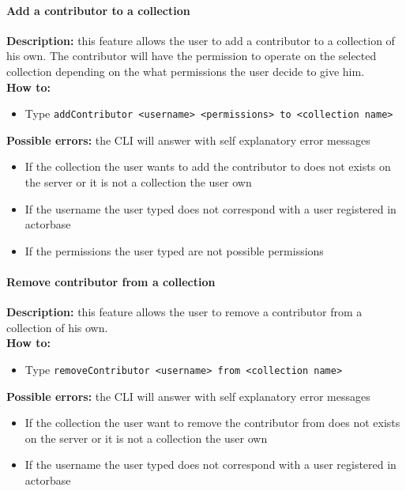 \documentclass{scalatekids-article}
\begin{document}
\paragraph{Add a contributor to a collection}
\label{sec:addcontributor}
\textbf{Description:} this feature allows the user to add a contributor 
to a collection of his own. The contributor will have the permission to operate on the selected collection depending on the what permissions the user decide to give him.\\
\textbf{How to:} 
\begin{itemize}
	\item Type \texttt{addContributor <username> <permissions> to <collection name>}
\end{itemize}
\textbf{Possible errors:} the CLI will answer with self explanatory error messages 
\begin{itemize}
	\item If the collection the user wants to add the contributor to does not exists on the server or it is not a collection the user own
	\item If the username the user typed does not correspond with a user registered in actorbase
	\item If the permissions the user typed are not possible permissions
\end{itemize}

\paragraph{Remove contributor from a collection}
\label{sec:removecontributor}
\textbf{Description:} this feature allows the user to remove a contributor from a collection of his own.\\
\textbf{How to:} 
\begin{itemize}
	\item Type \texttt{removeContributor <username> from <collection name>}
\end{itemize}
\textbf{Possible errors:} the CLI will answer with self explanatory error messages 
\begin{itemize}
	\item If the collection the user want to remove the contributor from does not exists on the server or it is not a collection the user own
	\item If the username the user typed does not correspond with a user registered in actorbase
\end{itemize}
\end{document}
